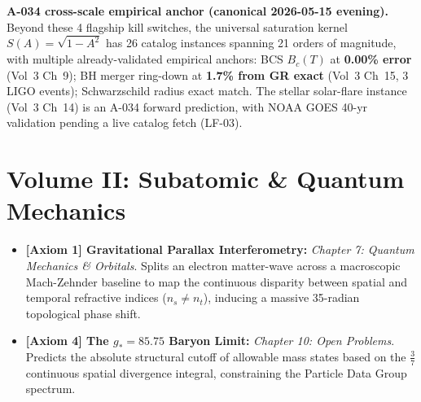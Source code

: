 \noindent\textbf{A-034 cross-scale empirical anchor (canonical 2026-05-15 evening).} Beyond these 4 flagship kill switches, the universal saturation kernel $S(A) = \sqrt{1 - A^2}$ has 26 catalog instances spanning 21 orders of magnitude, with multiple already-validated empirical anchors: BCS $B_c(T)$ at \textbf{0.00\% error} (Vol~3 Ch~9); BH merger ring-down at \textbf{1.7\% from GR exact} (Vol~3 Ch~15, 3 LIGO events); Schwarzschild radius exact match. The stellar solar-flare instance (Vol~3 Ch~14) is an A-034 forward prediction, with NOAA GOES 40-yr validation pending a live catalog fetch (LF-03). %

\section{Volume II: Subatomic \& Quantum Mechanics}
\begin{itemize}
    \item \textbf{[Axiom 1] Gravitational Parallax Interferometry:} \textit{Chapter 7: Quantum Mechanics \& Orbitals}. Splits an electron matter-wave across a macroscopic Mach-Zehnder baseline to map the continuous disparity between spatial and temporal refractive indices ($n_s \neq n_t$), inducing a massive 35-radian topological phase shift.
    \item \textbf{[Axiom 4] The $g_* = 85.75$ Baryon Limit:} \textit{Chapter 10: Open Problems}. Predicts the absolute structural cutoff of allowable mass states based on the $\frac{3}{7}$ continuous spatial divergence integral, constraining the Particle Data Group spectrum.
\end{itemize}

